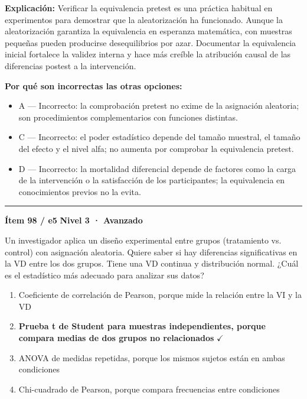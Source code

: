\documentclass[12pt,a4paper]{article}
\begin{document}
\noindent\textbf{\color{azul}Explicación:} Verificar la equivalencia pretest es una práctica habitual en experimentos para demostrar que la aleatorización ha funcionado. Aunque la aleatorización garantiza la equivalencia en esperanza matemática, con muestras pequeñas pueden producirse desequilibrios por azar. Documentar la equivalencia inicial fortalece la validez interna y hace más creíble la atribución causal de las diferencias postest a la intervención.

\noindent\textbf{\color{gris}Por qué son incorrectas las otras opciones:}
\begin{itemize}
  \item {\small A — Incorrecto: la comprobación pretest no exime de la asignación aleatoria; son procedimientos complementarios con funciones distintas.}
  \item {\small C — Incorrecto: el poder estadístico depende del tamaño muestral, el tamaño del efecto y el nivel alfa; no aumenta por comprobar la equivalencia pretest.}
  \item {\small D — Incorrecto: la mortalidad diferencial depende de factores como la carga de la intervención o la satisfacción de los participantes; la equivalencia en conocimientos previos no la evita.}
\end{itemize}
\vspace{8pt}\hrule\vspace{10pt}

\begin{mdframed}[backgroundcolor=fondogris,linecolor=rojo,linewidth=1pt,innerleftmargin=10pt,innerrightmargin=10pt,innertopmargin=7pt,innerbottommargin=7pt]
\textbf{Ítem 98 / e5} \hfill {\small\bfseries\color{rojo} Nivel 3 · Avanzado}
\end{mdframed}

Un investigador aplica un diseño experimental entre grupos (tratamiento vs. control) con asignación aleatoria. Quiere saber si hay diferencias significativas en la VD entre los dos grupos. Tiene una VD continua y distribución normal. ¿Cuál es el estadístico más adecuado para analizar sus datos?

\begin{enumerate}
  \item[A.] Coeficiente de correlación de Pearson, porque mide la relación entre la VI y la VD
  \item[\textbf{\color{verde}B.}] \textbf{\color{verde} Prueba t de Student para muestras independientes, porque compara medias de dos grupos no relacionados} \hfill $\checkmark$
  \item[C.] ANOVA de medidas repetidas, porque los mismos sujetos están en ambas condiciones
  \item[D.] Chi-cuadrado de Pearson, porque compara frecuencias entre condiciones
\end{enumerate}
\end{document}

